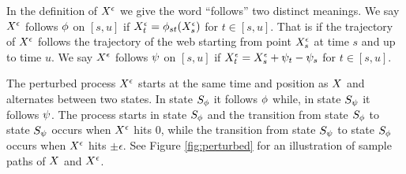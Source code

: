 {{  In the definition of $X^{\epsilon}$
  we give the word ``follows'' two distinct meanings.
  We say $X^{\epsilon}$ follows $\phi$ on $[s,u]$ if
  $X^{\epsilon}_t = \phi_{{s}{t}}(X^{\epsilon}_s)$ for $t \in [s,u]$.
  That is if the trajectory of $X^{\epsilon}$ follows the trajectory of
  the web starting from point $X^{\epsilon}_s$ at time $s$ and up to time $u$.
  We say $X^{\epsilon}$ follows $\psi$ on $[s,u]$ if
  $X^{\epsilon}_t = X^{\epsilon}_s + \psi_{t} - \psi_{s}$ for $t \in [s,u]$.

\begin{definition}
  \label{def:resamplede}
  The perturbed process $X^{\epsilon}$ starts at the same time and position
  as $X$ and
  alternates between two states.
  In state $S_{\phi}$ it follows
  $\phi$ while, in state $S_{\psi}$ it follows $\psi$.
  The process starts in state $S_{\phi}$ and
  the transition from state $S_{\phi}$ to state $S_{\psi}$ occurs
  when $X^{\epsilon}$ hits $0$, while
  the transition from state $S_{\psi}$ to state $S_{\phi}$ occurs when
  $X^{\epsilon}$ hits $\pm \epsilon$.
  See Figure \ref{fig:perturbed} for an illustration of sample paths of
  $X$ and $X^{\epsilon}$.
\end{definition}
}

}
